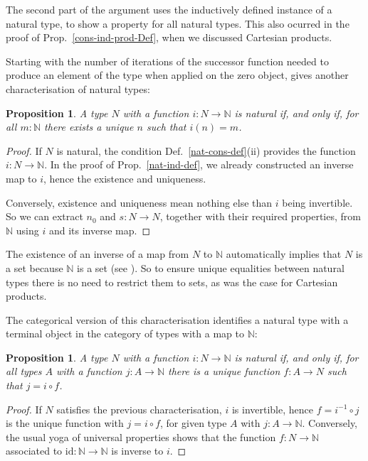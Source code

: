 \documentclass{amsart}
\theoremstyle{plain}
\numberwithin{equation}{section} %
\numberwithin{figure}{section} %
\theoremstyle{plain}
\theoremstyle{plain}
\theoremstyle{plain}
\theoremstyle{plain}
\theoremstyle{plain}
\newtheorem{prop}[thm]{Proposition} %
\theoremstyle{plain}
\theoremstyle{remark}
\theoremstyle{remark}
\theoremstyle{remark}
\begin{document}
The second part of the argument uses the inductively defined instance of a natural type, to show a property for all natural types. This also ocurred in the proof of Prop.~\ref{cons-ind-prod-Def}, when we discussed Cartesian products.

Starting with the number of iterations of the successor function needed to produce an element of the type when applied on the zero object, gives another characterisation of natural types:
\begin{prop} \label{ext-nat-char}   %
A type $N$ with a function $i : N \rightarrow \mathbb{N}$ is natural if, and only if, for all $m : \mathbb{N}$ there exists a unique $n$ such that $i(n) = m$.
\end{prop}
\begin{proof}
If $N$ is natural, the condition Def.~\ref{nat-cons-def}(ii) provides the function $i : N \rightarrow \mathbb{N}$. In the proof of Prop.~\ref{nat-ind-def}, we already constructed an inverse map to $i$, hence the existence and uniqueness.

Conversely, existence and uniqueness mean nothing else than $i$ being invertible. So we can extract $n_0$ and $s : N \rightarrow N$, together with their required properties, from $\mathbb{N}$ using $i$ and its inverse map. 
\end{proof}

The existence of an inverse of a map from $N$ to $\mathbb{N}$ automatically implies that $N$ is a set because $\mathbb{N}$ is a set (see \cite[Ex.12.3.2 \& Prop.12.4.5]{Rij22}). 
So to ensure unique equalities between natural types there is no need to restrict them to sets, as was the case for Cartesian products.

The categorical version of this characterisation identifies a natural type with a terminal object in the category of types with a map to $\mathbb{N}$:
\begin{prop}   %
A type $N$ with a function $i : N \rightarrow \mathbb{N}$ is natural if, and only if, for all types $A$ with a function $j : A \rightarrow \mathbb{N}$ there is a unique function $f : A \rightarrow N$ such that $j = i \circ f$.
\end{prop}
\begin{proof}
If $N$ satisfies the previous characterisation, $i$ is invertible, hence $f = i^{-1} \circ j$ is the unique function with $j = i \circ f$, for given type $A$ with $j : A \rightarrow \mathbb{N}$. Conversely, the usual yoga of universal properties shows that the function $f: N \rightarrow \mathbb{N}$ associated to $\mathrm{id} : \mathbb{N} \rightarrow \mathbb{N}$ is inverse to $i$. 
\end{proof}
\end{document}
